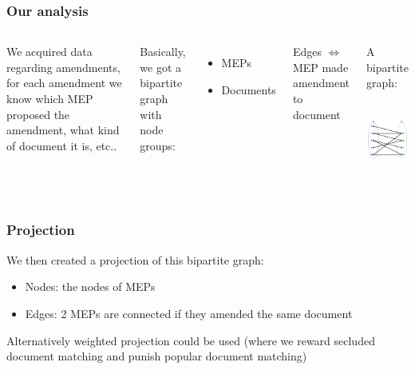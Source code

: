 \documentclass{beamer}
\begin{document}
\begin{frame}
\frametitle{Our analysis}

\begin{columns}

\column{5cm}

We acquired data regarding amendments, for each amendment we know which MEP proposed the amendment, what kind of document it is, etc..
\bigskip

\pause Basically, we got a bipartite graph with node groups:
\begin{itemize}
	\item MEPs
	\item Documents
\end{itemize}
\bigskip

\pause Edges $\iff$ MEP made amendment to document

\pause \column{5cm}
\begin{center}
\small{A bipartite graph:}
\bigskip
\includegraphics[height=3.2cm]{BipartiteGraph.png}
\end{center} 

\end{columns}
\end{frame}



\begin{frame}
\frametitle{Projection}

We then created a projection of this bipartite graph:

\begin{itemize}
	\pause \item Nodes: the nodes of MEPs
	\pause \item Edges: 2 MEPs are connected if they amended the same document	
\end{itemize}

\pause Alternatively weighted projection could be used (where we reward secluded document matching and punish popular document matching)

\end{frame}
\end{document}
